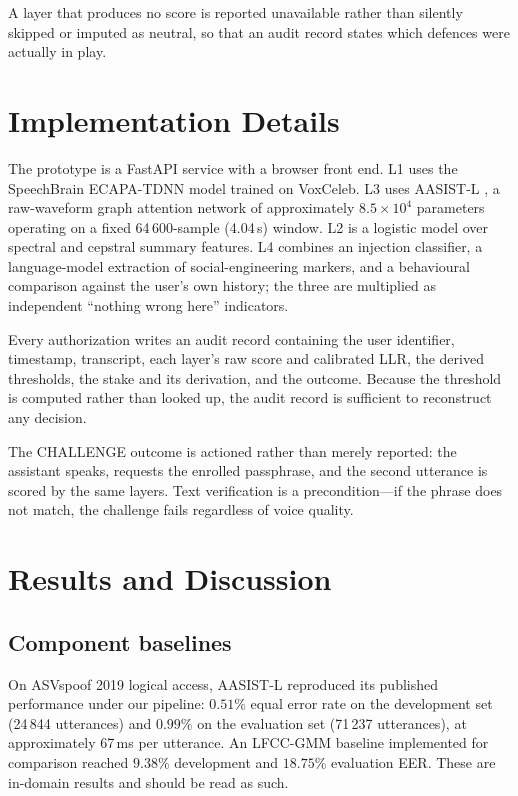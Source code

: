 \documentclass[conference]{IEEEtran}
\begin{document}
A layer that produces no score is reported unavailable rather than silently
skipped or imputed as neutral, so that an audit record states which defences
were actually in play.

\section{Implementation Details}

The prototype is a FastAPI service with a browser front end. L1 uses the
SpeechBrain ECAPA-TDNN model \cite{ravanelli2021speechbrain} trained on
VoxCeleb. L3 uses AASIST-L \cite{jung2022aasist}, a raw-waveform graph
attention network of approximately $8.5\times10^{4}$ parameters operating on a
fixed 64\,600-sample (4.04\,s) window. L2 is a logistic model over spectral and
cepstral summary features. L4 combines an injection classifier, a
language-model extraction of social-engineering markers, and a behavioural
comparison against the user's own history; the three are multiplied as
independent ``nothing wrong here'' indicators.

Every authorization writes an audit record containing the user identifier,
timestamp, transcript, each layer's raw score and calibrated LLR, the derived
thresholds, the stake and its derivation, and the outcome. Because the
threshold is computed rather than looked up, the audit record is sufficient to
reconstruct any decision.

The CHALLENGE outcome is actioned rather than merely reported: the assistant
speaks, requests the enrolled passphrase, and the second utterance is scored by
the same layers. Text verification is a precondition---if the phrase does not
match, the challenge fails regardless of voice quality.

\section{Results and Discussion}

\subsection{Component baselines}

On ASVspoof 2019 logical access, AASIST-L reproduced its published performance
under our pipeline: $0.51\%$ equal error rate on the development set
(24\,844 utterances) and $\mathbf{0.99\%}$ on the evaluation set (71\,237
utterances), at approximately 67\,ms per utterance. An LFCC-GMM baseline
implemented for comparison reached $9.38\%$ development and $18.75\%$
evaluation EER. These are in-domain results and should be read as such.
\end{document}
